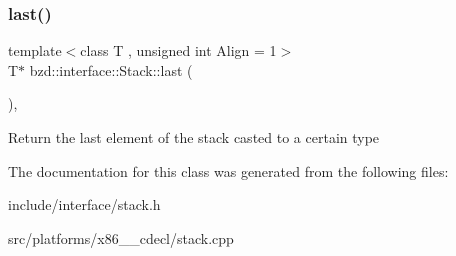 \subsubsection{\texorpdfstring{last()}{last()}}
{\footnotesize\ttfamily template$<$class T , unsigned int Align = 1$>$ \\
T$\ast$ bzd\+::interface\+::\+Stack\+::last (\begin{DoxyParamCaption}{ }\end{DoxyParamCaption})\hspace{0.3cm}{\ttfamily [inline]}, {\ttfamily [protected]}}

Return the last element of the stack casted to a certain type 

The documentation for this class was generated from the following files\+:\begin{DoxyCompactItemize}
\item 
include/interface/stack.\+h\item 
src/platforms/x86\+\_\+\_\+cdecl/stack.\+cpp\end{DoxyCompactItemize}
